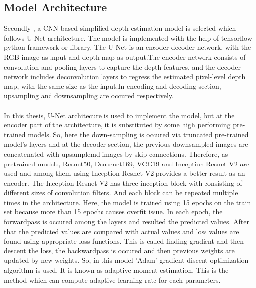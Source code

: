 \documentclass[a4paper,12pt,oneside]{book}
\begin{document}
\subsection{Model Architecture}
Secondly , a CNN based simplified depth estimation model is selected which follows U-Net architecture. The model is implemented with the help of tensorflow python framework or library. The U-Net is an encoder-decoder network, with the RGB image as input and depth map as output.The encoder network
consists of convolution and pooling layers to capture the depth features, and the decoder network includes deconvolution layers to
regress the estimated pixel-level depth map, with the same size as the input.In encoding and decoding section, upsampling and downsampling are occured respectively.\\\\
In this thesis, U-Net architecure is used to implement the model, but at the encoder part of the architecture, it is substituted by some high performing pre-trained models. So, here the down-sampling is occured via truncated pre-trained model's layers and at the decoder section, the previous downsampled images are concatenated with upsamplemd images by skip connections. Therefore, as pretrained models, Resnet50, Densenet169, VGG19 and Inception-Resnet V2 \cite{szegedy2016inceptionv4} are used and among them using Inception-Resnet V2 provides a better result as an encoder. The Inception-Resnet V2 has three inception block with consisting of different sizes of convolution filters. And each block can be repeated multiple times in the architecture. Here, the model is trained using 15 epochs on the train set because more than 15 epochs causes overfit issue. In each epoch, the forwardpass is occured among the layers and resulted the predicted values. After that the predicted values are compared with actual values and loss values are found using appropriate loss functions.
This is called finding gradient and then descent the loss, the backwardpass is occured and then previous weights are updated by new weights.
So, in this model 'Adam' gradient-discent optimization algorithm is used. It is known as adaptive moment estimation. This is the method which can compute adaptive learning rate for each parameters.
\end{document}
